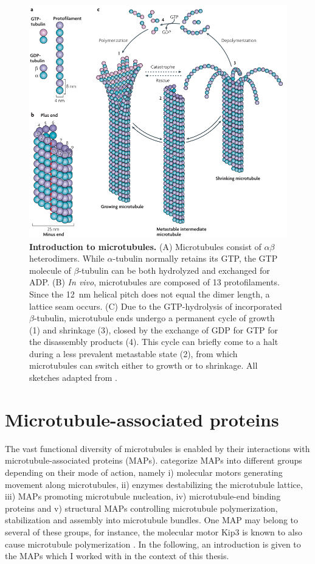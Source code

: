 \begin{figure}[h!tb]
\centering
\includegraphics[scale=0.65]{Figures/MTintro.png}
\caption[Introduction to microtubules.]{\textbf{Introduction to microtubules.}
(A) Microtubules consist of $\alpha\beta$ heterodimers. While $\alpha$-tubulin normally retains its GTP, the GTP molecule of $\beta$-tubulin can be both hydrolyzed and exchanged for ADP. (B) \textit{In vivo}, microtubules are composed of 13 protofilaments. Since the \SI{12}{\nm} helical pitch does not equal the dimer length, a lattice seam occurs. (C) Due to the GTP-hydrolysis of incorporated $\beta$-tubulin, microtubule ends undergo a permanent cycle of growth (1) and shrinkage (3), closed by the exchange of GDP for GTP for the disassembly products (4). This cycle can briefly come to a halt during a less prevalent metastable state (2), from which microtubules can switch either to growth or to shrinkage. All sketches adapted from \cite{Akhmanova2008}.
	}\label{MTintro}
\end{figure}
 \FloatBarrier

\section{Microtubule-associated proteins}
\label{sec:MAPs}
The vast functional diversity of microtubules is enabled by their interactions with microtubule-associated proteins (MAPs). \cite{BODAKUNTLA2019804} categorize MAPs into different groups depending on their mode of action, namely i) molecular motors generating movement along microtubules, ii) enzymes destabilizing the microtubule lattice, iii) MAPs promoting microtubule nucleation, iv) microtubule-end binding proteins and v) structural MAPs controlling microtubule polymerization, stabilization and assembly into microtubule bundles. One MAP may belong to several of these groups, for instance, the molecular motor Kip3 is known to also cause microtubule polymerization \parencite{Gardner2011a}. In the following, an introduction is given to the MAPs which I worked with in the context of this thesis.

